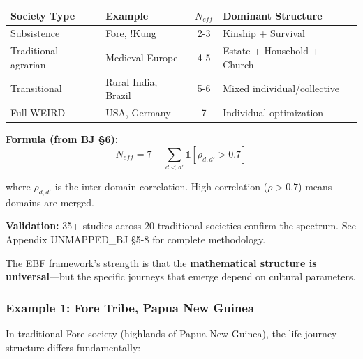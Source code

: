 {{{\begin{tcolorbox}[colback=blue!5!white, colframe=blue!75!black, title=N$_{eff}$ Spectrum: Cross-Cultural Domain Validation (from Appendix UNMAPPED_BJ)]
\begin{center}
\small
\begin{tabular}{@{}llcl@{}}
\toprule
\textbf{Society Type} & \textbf{Example} & \textbf{$N_{eff}$} & \textbf{Dominant Structure} \\
\midrule
Subsistence & Fore, !Kung & 2-3 & Kinship + Survival \\
Traditional agrarian & Medieval Europe & 4-5 & Estate + Household + Church \\
Transitional & Rural India, Brazil & 5-6 & Mixed individual/collective \\
Full WEIRD & USA, Germany & 7 & Individual optimization \\
\bottomrule
\end{tabular}
\end{center}

\textbf{Formula (from BJ §6):}
\begin{equation}
N_{eff} = 7 - \sum_{d < d'} \mathbb{1}[\rho_{d,d'} > 0.7]
\end{equation}

where $\rho_{d,d'}$ is the inter-domain correlation. High correlation ($\rho > 0.7$) means domains are merged.

\textbf{Validation:} 35+ studies across 20 traditional societies confirm the spectrum. See Appendix UNMAPPED_BJ §5-8 for complete methodology.

\end{tcolorbox}

The EBF framework's strength is that the \textbf{mathematical structure is universal}---but the specific journeys that emerge depend on cultural parameters.

\subsubsection{Example 1: Fore Tribe, Papua New Guinea}

In traditional Fore society (highlands of Papua New Guinea), the life journey structure differs fundamentally:

}}}
